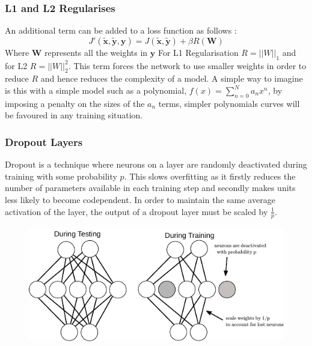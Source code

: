     \subsubsection{L1 and L2 Regularises} \label{sec:bacl2}
      An additional term can be added to a loss function as follows \cite{Ng2004a}:
      \begin{equation}
        J'(\tilde{\mathbf{x}},\tilde{\mathbf{y}},\mathbf{y}) = J(\tilde{\mathbf{x}},\tilde{\mathbf{y}}) + \beta R(\mathbf{W})
      \end{equation}
      Where $\mathbf{W}$ represents all the weights in $\mathbf{y}$ For L1 Regularisation $R = ||W||_1$ and for L2 $R = ||W||_2^2$.
      This term forces the network to use smaller weights in order to reduce $R$
      and hence reduces the complexity of a model. A simple way to imagine is this
      with a simple model such as a polynomial, $f(x)=\sum_{n=0}^N a_n x^n$, by imposing a
      penalty on the sizes of the $a_n$ terms, simpler polynomials curves will be favoured in
      any training situation.
    \subsubsection{Dropout Layers} \label{sec:dropout}
      Dropout \cite{Srivastava2014} is a technique where neurons on a layer are
      randomly deactivated during training with some probability $p$. This slows overfitting
      as it firstly reduces the number of parameters available in each training step and secondly
      makes units less likely to become codependent. In order to maintain the same average activation
      of the layer, the output of a dropout layer must be scaled by $\frac{1}{p}$.

      \begin{figure}[h!]
       \centering
       \includegraphics[width=\textwidth]{illustrations/dropout.pdf}
      \end{figure}

